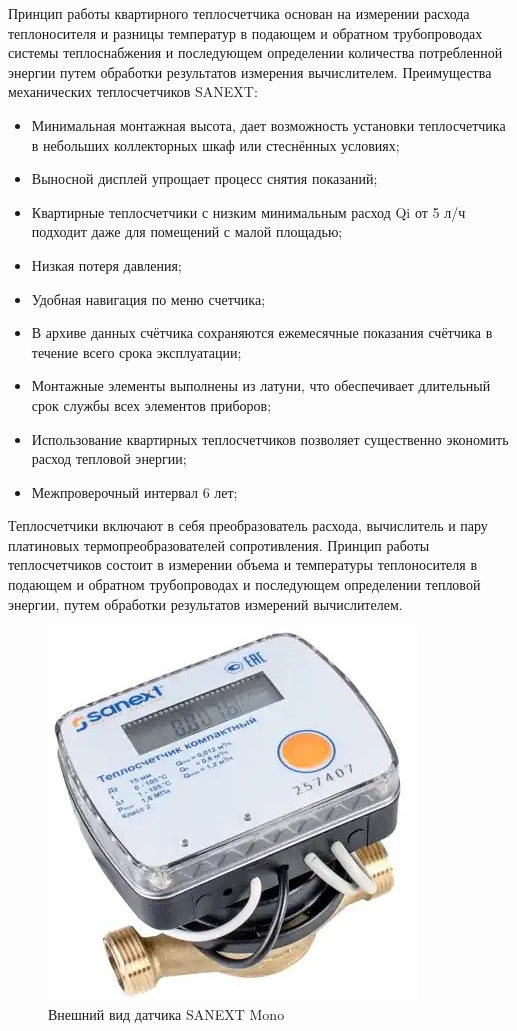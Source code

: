 Принцип работы квартирного теплосчетчика основан на измерении расхода теплоносителя и разницы температур в подающем и обратном трубопроводах системы теплоснабжения и последующем определении количества потребленной энергии путем обработки результатов измерения вычислителем. \cite{sanext}
Преимущества механических теплосчетчиков SANEXT:

\begin{itemize}
	\item Минимальная монтажная высота, дает возможность установки теплосчетчика в небольших коллекторных шкаф или стеснённых условиях;
	\item Выносной дисплей упрощает процесс снятия показаний;
	\item Квартирные теплосчетчики с низким минимальным расход Qi от 5 л/ч подходит даже для помещений с малой площадью;
	\item Низкая потеря давления;
	\item Удобная навигация по меню счетчика;
	\item В архиве данных счётчика сохраняются ежемесячные показания счётчика в течение всего срока эксплуатации;
	\item Монтажные элементы выполнены из латуни, что обеспечивает длительный срок службы всех элементов приборов;
	\item Использование квартирных теплосчетчиков позволяет существенно экономить расход тепловой энергии;
	\item Межпроверочный интервал 6 лет;
\end{itemize}

Теплосчетчики включают в себя преобразователь расхода, вычислитель и пару платиновых термопреобразователей сопротивления.
Принцип работы теплосчетчиков состоит в измерении объема и температуры теплоносителя в подающем и обратном трубопроводах и последующем определении тепловой энергии, путем обработки результатов измерений вычислителем.

\begin{figure}[H]
	\centering
	\includegraphics[width=0.4\linewidth]{pics/SANEXT}
	\caption{Внешний вид датчика SANEXT Mono}
	\label{fig:sanext}
\end{figure}

